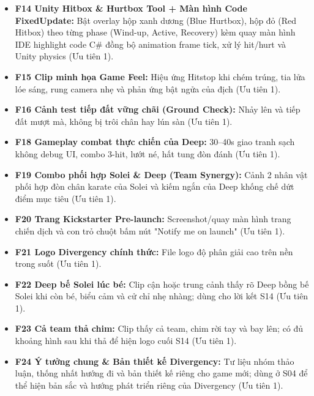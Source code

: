 \documentclass[11pt,a4paper]{article}
\newcommand{\tickbox}{\fbox{\rule{0pt}{0.75em}\hspace{0.75em}}}
\begin{document}
\begin{itemize}[label=\tickbox]
    \item \textbf{F14 Unity Hitbox \& Hurtbox Tool + Màn hình Code FixedUpdate:} Bật overlay hộp xanh dương (Blue Hurtbox), hộp đỏ (Red Hitbox) theo từng phase (Wind-up, Active, Recovery) kèm quay màn hình IDE highlight code C\# đồng bộ animation frame tick, xử lý hit/hurt và Unity physics (Ưu tiên 1).
    \item \textbf{F15 Clip minh họa Game Feel:} Hiệu ứng Hitstop khi chém trúng, tia lửa lóe sáng, rung camera nhẹ và phản ứng bật ngửa của địch (Ưu tiên 1).
    \item \textbf{F16 Cảnh test tiếp đất vững chãi (Ground Check):} Nhảy lên và tiếp đất mượt mà, không bị trôi chân hay lún sàn (Ưu tiên 1).
    \item \textbf{F18 Gameplay combat thực chiến của Deep:} 30–40s giao tranh sạch không debug UI, combo 3-hit, lướt né, hất tung đòn đánh (Ưu tiên 1).
    \item \textbf{F19 Combo phối hợp Solei \& Deep (Team Synergy):} Cảnh 2 nhân vật phối hợp đòn chân karate của Solei và kiếm ngắn của Deep khống chế dứt điểm mục tiêu (Ưu tiên 1).
    \item \textbf{F20 Trang Kickstarter Pre-launch:} Screenshot/quay màn hình trang chiến dịch và con trỏ chuột bấm nút "Notify me on launch" (Ưu tiên 1).
    \item \textbf{F21 Logo Divergency chính thức:} File logo độ phân giải cao trên nền trong suốt (Ưu tiên 1).
    \item \textbf{F22 Deep bế Solei lúc bé:} Clip cận hoặc trung cảnh thấy rõ Deep bồng bế Solei khi còn bé, biểu cảm và cử chỉ nhẹ nhàng; dùng cho lời kết S14 (Ưu tiên 1).
    \item \textbf{F23 Cả team thả chim:} Clip thấy cả team, chim rời tay và bay lên; có đủ khoảng hình sau khi thả để hiện logo cuối S14 (Ưu tiên 1).
    \item \textbf{F24 Ý tưởng chung \& Bản thiết kế Divergency:} Tư liệu nhóm thảo luận, thống nhất hướng đi và bản thiết kế riêng cho game mới; dùng ở S04 để thể hiện bản sắc và hướng phát triển riêng của Divergency (Ưu tiên 1).
\end{itemize}
\end{document}
